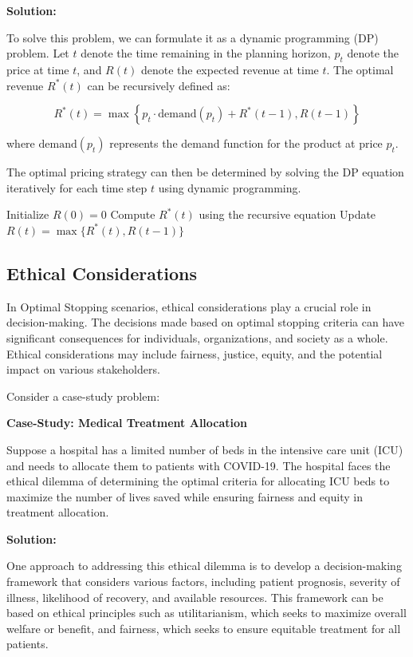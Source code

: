 \documentclass[12pt]{book} %
\begin{document}
\textbf{Solution:}

To solve this problem, we can formulate it as a dynamic programming (DP) problem. Let \(t\) denote the time remaining in the planning horizon, \(p_t\) denote the price at time \(t\), and \(R(t)\) denote the expected revenue at time \(t\). The optimal revenue \(R^*(t)\) can be recursively defined as:

\[
R^*(t) = \max\left\{p_t \cdot \text{demand}(p_t) + R^*(t-1), R(t-1)\right\}
\]

where \(\text{demand}(p_t)\) represents the demand function for the product at price \(p_t\).

The optimal pricing strategy can then be determined by solving the DP equation iteratively for each time step \(t\) using dynamic programming.
\FloatBarrier
\begin{algorithm}
\caption{Dynamic Programming Algorithm for Optimal Pricing Strategy}\label{alg:pricing}
\begin{algorithmic}[1]
\State Initialize $R(0) = 0$
    \State Compute $R^*(t)$ using the recursive equation
    \State Update $R(t) = \max\{R^*(t), R(t-1)\}$
\EndFor
\end{algorithmic}
\end{algorithm}
\FloatBarrier

\subsection{Ethical Considerations}

In Optimal Stopping scenarios, ethical considerations play a crucial role in decision-making. The decisions made based on optimal stopping criteria can have significant consequences for individuals, organizations, and society as a whole. Ethical considerations may include fairness, justice, equity, and the potential impact on various stakeholders.

Consider a case-study problem:

\textbf{Case-Study: Medical Treatment Allocation}

Suppose a hospital has a limited number of beds in the intensive care unit (ICU) and needs to allocate them to patients with COVID-19. The hospital faces the ethical dilemma of determining the optimal criteria for allocating ICU beds to maximize the number of lives saved while ensuring fairness and equity in treatment allocation.

\textbf{Solution:}

One approach to addressing this ethical dilemma is to develop a decision-making framework that considers various factors, including patient prognosis, severity of illness, likelihood of recovery, and available resources. This framework can be based on ethical principles such as utilitarianism, which seeks to maximize overall welfare or benefit, and fairness, which seeks to ensure equitable treatment for all patients.
\end{document}
